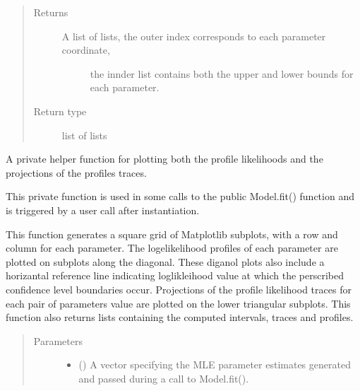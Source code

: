 \documentclass[letterpaper,10pt,english,openany,oneside]{sphinxmanual}
\begin{document}
\begin{fulllineitems}
\begin{fulllineitems}
\begin{quote}
\begin{description}
\begin{itemize}
\end{itemize}

\item[{Returns}] \leavevmode
\begin{description}
\item[{A list of lists, the outer index corresponds to each parameter coordinate,}] \leavevmode
the innder list contains both the upper and lower bounds for each parameter.

\end{description}


\item[{Return type}] \leavevmode
list of lists

\end{description}\end{quote}

\end{fulllineitems}


\begin{fulllineitems}
\label{\detokenize{nloed:nloed.model.Model.__profile_plot}}
A private helper function for plotting both the profile likelihoods and the projections
of the profiles traces.

This private function is used in some calls to the public Model.fit() function and is
triggered by a user call after instantiation.

This function generates a square grid of Matplotlib sub\sphinxhyphen{}plots, with a row and column for each
parameter. The logelikelihood profiles of each parameter are plotted on sub\sphinxhyphen{}plots along the
diagonal. These diganol plots also include a horizantal reference line indicating
loglikleihood value at which the perscribed confidence level boundaries occur. Projections
of the profile likelihood traces for each pair of parameters value are plotted on the lower
triangular sub\sphinxhyphen{}plots. This function also returns lists containing the computed intervals,
traces and profiles.
\begin{quote}\begin{description}
\item[{Parameters}] \leavevmode\begin{itemize}
\item {} 
 (\sphinxstyleliteralemphasis{\sphinxupquote{, }}) \textendash{} A vector specifying the MLE parameter estimates generated and
passed during a call to Model.fit().


\end{itemize}
\end{description}
\end{quote}
\end{fulllineitems}
\end{fulllineitems}
\end{document}
